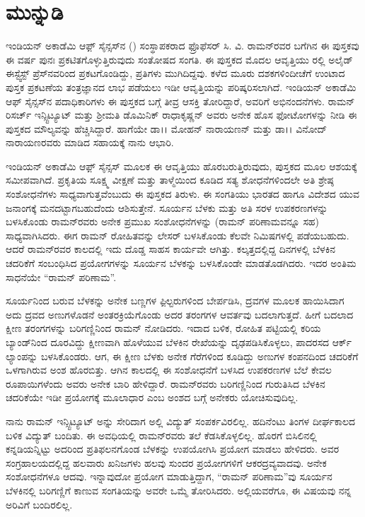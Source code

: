 
\chapter*{ಮುನ್ನುಡಿ}

ಇಂಡಿಯನ್ ಅಕಾಡೆಮಿ ಆಫ಼್ ಸೈನ್ಸಸ್‍ನ () ಸಂಸ್ಥಾಪಕರಾದ ಫ್ರೊಫೆಸರ್ ಸಿ. ವಿ. ರಾಮನ್‍ರವರ ಬಗೆಗಿನ ಈ ಪುಸ್ತಕವು ಈ ವರ್ಷ ಪುನಃ ಪ್ರಕಟಿತಗೊಳ್ಳುತ್ತಿರುವುದು ಸಂತೋಷದ ಸಂಗತಿ. ಈ ಪುಸ್ತಕದ ಮೊದಲ ಆವೃತ್ತಿಯು ರಲ್ಲಿ ಅಲೈಡ್ ಈಸ್ಟ್\enginline{-}ವೆಸ್ಟ್ ಪ್ರೆಸ್‍ನವರಿಂದ ಪ್ರಕಟಗೊಂಡಿದ್ದು, ಪ್ರತಿಗಳು ಮುಗಿದಿದ್ದವು. ಕಳೆದ ಮೂರು ದಶಕಗಳಿಂದೀಚೆಗೆ ಉಂಟಾದ ಪುಸ್ತಕ ಪ್ರಕಟಣೆಯ ತಂತ್ರಜ್ಞಾನದ ಲಾಭ ಪಡೆಯಲು ಇಡೀ ಆವೃತ್ತಿಯನ್ನು ಪರಿಷ್ಕರಿಸಲಾಗಿದೆ. ಇಂಡಿಯನ್ ಅಕಾಡೆಮಿ ಆಫ್ ಸೈನ್ಸಸ್‍ನ ಪದಾಧಿಕಾರಿಗಳು ಈ ಪುಸ್ತಕದ ಬಗ್ಗೆ ತೀವ್ರ ಆಸಕ್ತಿ ತೋರಿದ್ದಾರೆ, ಅವರಿಗೆ ಅಭಿನಂದನೆಗಳು. ರಾಮನ್ ರಿಸರ್ಚ್ ಇನ್ಸ್ಟಿಟ್ಯೂಟ್ ಮತ್ತು ಶ‍್ರೀಮತಿ ಡೊಮಿನಿಕ್ ರಾಧಾಕೃಷ್ಣನ್ ಅವರು ಅನೇಕ ಹೊಸ ಫೋಟೋಗಳನ್ನು ನೀಡಿ ಈ ಪುಸ್ತಕದ ಮೌಲ್ಯವನ್ನು ಹೆಚ್ಚಿಸಿದ್ದಾರೆ. ಹಾಗೆಯೇ ಡಾ।। ಮೋಹನ್ ನಾರಾಯಣನ್ ಮತ್ತು ಡಾ।। ವಿನೋದ್ ನಾರಾಯಣರವರು ಮಾಡಿದ ಸಹಾಯಕ್ಕೆ ನಾನು ಆಭಾರಿ.

ಇಂಡಿಯನ್ ಅಕಾಡೆಮಿ ಆಫ಼್ ಸೈನ್ಸಸ್ ಮೂಲಕ ಈ ಆವೃತ್ತಿಯು ಹೊರಬರುತ್ತಿರುವುದು, ಪುಸ್ತಕದ ಮೂಲ ಆಶಯಕ್ಕೆ ಸಮೀಪವಾಗಿದೆ. ಪ್ರಕೃತಿಯ ಸೂಕ್ಷ್ಮ ವೀಕ್ಷಣೆ ಮತ್ತು ತಾಳ್ಮೆಯಿಂದ ಕೂಡಿದ ಸತ್ಯ ಶೋಧನೆಗಳಿಂದಲೇ ಅತಿ ಶ್ರೇಷ್ಠ ಸಂಶೋಧನೆಗಳು ಸಾಧ್ಯವಾಗುತ್ತವೆಂಬುದು ಈ ಪುಸ್ತಕದ ತಿರುಳು. ಈ ಸಂಗತಿಯು ಭಾರತದ ಹಾಗೂ ವಿದೇಶದ ಯುವ ಜನಾಂಗಕ್ಕೆ ಮನದಟ್ಟಾಗಬಹುದೆಂದು ಆಶಿಸುತ್ತೇನೆ. ಸೂರ್ಯನ ಬೆಳಕು ಮತ್ತು ಅತಿ ಸರಳ ಉಪಕರಣಗಳನ್ನು ಬಳಸಿಕೊಂಡು ರಾಮನ್‍ರವರು ಅನೇಕ ಪ್ರಮುಖ ಸಂಶೋಧನೆಗಳನ್ನು (ರಾಮನ್ ಪರಿಣಾಮವನ್ನೂ ಸಹ) ಸಾಧ್ಯವಾಗಿಸಿದರು. ಈಗ ರಾಮನ್ ರೋಹಿತವನ್ನು  ಲೇಸರ್ ಬಳಸಿಕೊಂಡು ಕೆಲವೇ ನಿಮಿಷಗಳಲ್ಲಿ ಪಡೆಯಬಹುದು. ಆದರೆ ರಾಮನ್‍ರವರ ಕಾಲದಲ್ಲಿ ಇದು ದೊಡ್ಡ ಸಾಹಸ ಕಾರ್ಯವೇ ಆಗಿತ್ತು. ಕಲ್ಕತ್ತದಲ್ಲಿದ್ದ ದಿನಗಳಲ್ಲಿ ಬೆಳಕಿನ ಚದರಿಕೆಗೆ ಸಂಬಂಧಿಸಿದ ಪ್ರಯೋಗಗಳನ್ನು ಸೂರ್ಯನ ಬೆಳಕನ್ನು ಬಳಸಿಕೊಂಡೇ ಮಾಡತೊಡಗಿದರು. ಇದರ ಅಂತಿಮ ಸಾಧನೆಯೇ “ರಾಮನ್ ಪರಿಣಾಮ”.

ಸೂರ್ಯನಿಂದ ಬರುವ ಬೆಳಕನ್ನು ಅನೇಕ ಬಣ್ಣಗಳ ಫಿ಼ಲ್ಟರುಗಳಿಂದ ಬೇರ್ಪಡಿಸಿ, ದ್ರವಗಳ ಮೂಲಕ ಹಾಯಿಸಿದಾಗ ಅದು ದ್ರವದ ಅಣುಗಳೊಡನೆ ಅಂತರಕ್ರಿಯೆಗೊಂಡು ಅದರ ತರಂಗಗಳ ಆವರ್ತವು ಬದಲಾಗುತ್ತದೆ. ಹೀಗೆ ಬದಲಾದ ಕ್ಷೀಣ ತರಂಗಗಳನ್ನು ಬರಿಗಣ್ಣಿನಿಂದ ರಾಮನ್ ನೋಡಿದರು. ಇದಾದ ಬಳಿಕ, ರೋಹಿತ ಪಟ್ಟಿಯಲ್ಲಿ ಕರಿಯ ಬ್ಯಾಂಡ್‍ನಿಂದ ದೂರವಿದ್ದು ಕ್ಷೀಣವಾಗಿ ಹೊಳೆಯುವ ಬೆಳಕಿನ ರೇಖೆಯನ್ನು ದೃಢಪಡಿಸಿಕೊಳ್ಳಲು, ಪಾದರಸದ ಆರ್ಕ್ ಲ್ಯಾಂಪನ್ನು ಬಳಸಿಕೊಂಡರು. ಆಗ, ಈ ಕ್ಷೀಣ ಬೆಳಕು ಅನೇಕ ಗೆರೆಗಳಿಂದ ಕೂಡಿದ್ದು ಅಣುಗಳ ಕಂಪನದಿಂದ ಚದರಿಕೆಗೆ ಒಳಗಾಗಿರುವ ಅಂಶ ಹೊರಬಿತ್ತು. ಆಗಿನ ಕಾಲದಲ್ಲಿ ಈ ಸಂಶೋಧನೆಗೆ ಬಳಸಿದ ಉಪಕರಣಗಳ ಬೆಲೆ ಕೇವಲ  ರೂಪಾಯಿಗಳೆಂದು ಅವರು ಅನೇಕ ಬಾರಿ ಹೇಳಿದ್ದಾರೆ. ರಾಮನ್‍ರವರು ಬರಿಗಣ್ಣಿನಿಂದ ಗುರುತಿಸಿದ ಬೆಳಕಿನ ಚದರಿಕೆಯೇ ಇಡೀ ಪ್ರಯೋಗಕ್ಕೆ ಮೂಲಾಧಾರ ಎಂಬ ಅಂಶದ ಬಗ್ಗೆ ಅನೇಕರು ಯೋಚಿಸುವುದಿಲ್ಲ.

ನಾನು ರಾಮನ್ ಇನ್ಸ್ಟಿಟ್ಯೂಟ್ ಅನ್ನು ಸೇರಿದಾಗ ಅಲ್ಲಿ ವಿದ್ಯುತ್ ಸಂಪರ್ಕವಿರಲಿಲ್ಲ. ಹದಿನೆಂಟು ತಿಂಗಳ ದೀರ್ಘಕಾಲದ ಬಳಿಕ ವಿದ್ಯುತ್ ಬಂದಿತು. ಈ ಅವಧಿಯಲ್ಲಿ ರಾಮನ್‍ರವರು ತಲೆ ಕೆಡಸಿಕೊಳ್ಳಲಿಲ್ಲ. ಹೊರಗೆ ಬಿಸಿಲಿನಲ್ಲಿ ಕನ್ನಡಿಯನ್ನಿಟ್ಟು ಅದರಿಂದ ಪ್ರತಿಫಲನಗೊಂಡ ಬೆಳಕನ್ನು ಉಪಯೋಗಿಸಿ ಪ್ರಯೋಗ ಮಾಡಲು ಹೇಳಿದರು. ಅವರ ಸಂಗ್ರಹಾಲಯದಲ್ಲಿದ್ದ ಹಲವಾರು ಖನಿಜಗಳು ಹಲವು ಸುಂದರ ಪ್ರಯೋಗಗಳಿಗೆ ಆಕರದ್ರವ್ಯವಾದವು. ಅನೇಕ ಸಂಶೋಧನೆಗಳೂ ಆದವು. ಇನ್ನಾವುದೋ ಪ್ರಯೋಗ ಮಾಡುತ್ತಿದ್ದಾಗ, “ರಾಮನ್ ಪರಿಣಾಮ”ವು ಸೂರ್ಯನ ಬೆಳಕಿನಲ್ಲಿ ಬರಿಗಣ್ಣಿಗೆ ಕಾಣುವ ಸಂಗತಿಯನ್ನು ಅವರೇ ಒಮ್ಮೆ ತೋರಿಸಿದರು. ಅಲ್ಲಿಯವರೆಗೂ, ಈ ವಿಷಯವು ನನ್ನ ಅರಿವಿಗೆ ಬಂದಿರಲಿಲ್ಲ.


